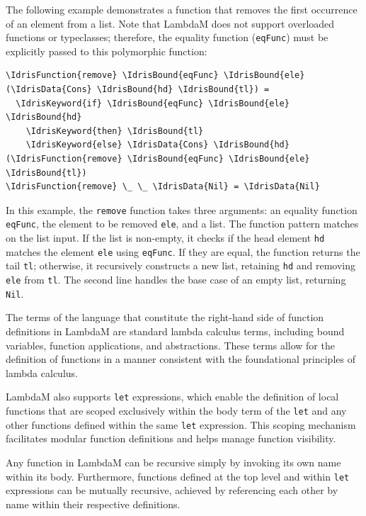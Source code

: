 \documentclass{IEEEtran}
\begin{document}
\par The following example demonstrates a function that removes the first occurrence of an element from a list. Note that LambdaM does not support overloaded functions or typeclasses; therefore, the equality function (\texttt{eqFunc}) must be explicitly passed to this polymorphic function:

\begin{Verbatim}[commandchars=\\\{\}]
\IdrisFunction{remove} \IdrisBound{eqFunc} \IdrisBound{ele} (\IdrisData{Cons} \IdrisBound{hd} \IdrisBound{tl}) =
  \IdrisKeyword{if} \IdrisBound{eqFunc} \IdrisBound{ele} \IdrisBound{hd}
    \IdrisKeyword{then} \IdrisBound{tl}
    \IdrisKeyword{else} \IdrisData{Cons} \IdrisBound{hd} (\IdrisFunction{remove} \IdrisBound{eqFunc} \IdrisBound{ele} \IdrisBound{tl})
\IdrisFunction{remove} \_ \_ \IdrisData{Nil} = \IdrisData{Nil}
\end{Verbatim}

\par In this example, the \texttt{remove} function takes three arguments: an equality function \texttt{eqFunc}, the element to be removed \texttt{ele}, and a list. The function pattern matches on the list input. If the list is non-empty, it checks if the head element \texttt{hd} matches the element \texttt{ele} using \texttt{eqFunc}. If they are equal, the function returns the tail \texttt{tl}; otherwise, it recursively constructs a new list, retaining \texttt{hd} and removing \texttt{ele} from \texttt{tl}. The second line handles the base case of an empty list, returning \texttt{Nil}.

\par The terms of the language that constitute the right-hand side of function definitions in LambdaM are standard lambda calculus terms, including bound variables, function applications, and abstractions. These terms allow for the definition of functions in a manner consistent with the foundational principles of lambda calculus.

\par LambdaM also supports \texttt{let} expressions, which enable the definition of local functions that are scoped exclusively within the body term of the \texttt{let} and any other functions defined within the same \texttt{let} expression. This scoping mechanism facilitates modular function definitions and helps manage function visibility.

\par Any function in LambdaM can be recursive simply by invoking its own name within its body. Furthermore, functions defined at the top level and within \texttt{let} expressions can be mutually recursive, achieved by referencing each other by name within their respective definitions.
\end{document}

